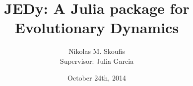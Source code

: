 \documentclass[a4paper,11pt]{article}
\begin{document}
\title{JEDy: A Julia package for Evolutionary Dynamics}
\author{Nikolas M. Skoufis \\ Supervisor: Julia Garcia}
\date{October 24th, 2014}

\maketitle






\end{document}
